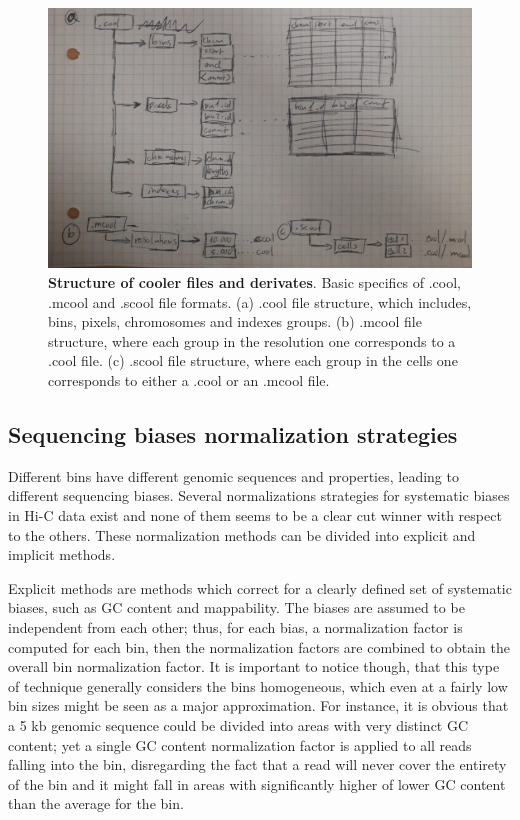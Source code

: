 \begin{figure}
  \centering
  \includegraphics[width=1\textwidth]{cooler_format.jpeg}
  \caption{\textbf{Structure of cooler files and derivates}. Basic specifics of .cool, .mcool and .scool file formats. (a) .cool file structure, which includes, bins, pixels, chromosomes and indexes groups. (b) .mcool file structure, where each group in the resolution one corresponds to a .cool file. (c) .scool file structure, where each group in the cells one corresponds to either a .cool or an .mcool file.}
  \label{fig:cooler}
\end{figure}

\subsection{Sequencing biases normalization strategies}

Different bins have different genomic sequences and properties, leading to different sequencing biases. Several normalizations strategies for systematic biases in Hi-C data exist and none of them seems to be a clear cut winner with respect to the others\cite{normalization2020}. These normalization methods can be divided into explicit and implicit methods. 

Explicit methods are methods which correct for a clearly defined set of systematic biases, such as GC content and mappability. The biases are assumed to be independent from each other; thus, for each bias, a normalization factor is computed for each bin, then the normalization factors are combined to obtain the overall bin normalization factor. It is important to notice though, that this type of technique generally considers the bins homogeneous, which even at a fairly low bin sizes might be seen as a major approximation. For instance, it is obvious that a 5 kb genomic sequence could be divided into areas with very distinct GC content; yet a single GC content normalization factor is applied to all reads falling into the bin, disregarding the fact that a read will never cover the entirety of the bin and it might fall in areas with significantly higher of lower GC content than the average for the bin.

